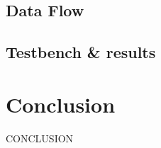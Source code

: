 \documentclass[9pt,a4paper,twoside]{tau}
\begin{document}
    \subsection{Data Flow}

    \subsection{Testbench \& results}


     
\section{Conclusion}
\justifying

CONCLUSION



\printbibliography

\end{document}

